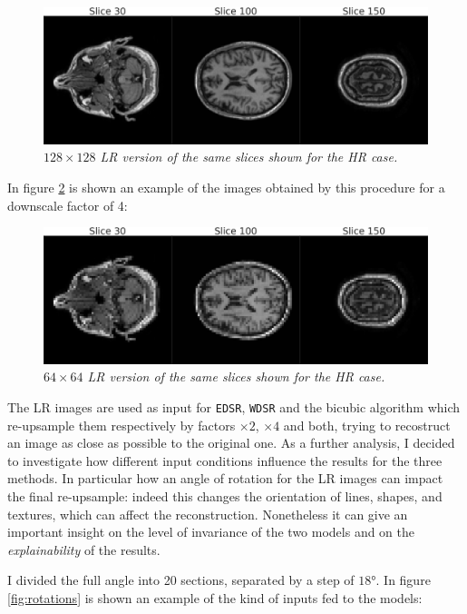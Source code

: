 \documentclass[12pt,a4paper]{report}
\begin{document}
\begin{figure}[H]
 \centering
 \includegraphics[scale=0.3]{images/inp2_slice_comp.png}
 \caption{\it $128 \times 128$ LR version of the same slices shown for the HR case.}
 \label{fig:inp2}
\end{figure}

In figure \ref{fig:inp4} is shown an example of the images obtained by this procedure for a downscale factor of 4:

\begin{figure}[H]
 \centering
 \includegraphics[scale=0.3]{images/inp4_slice_comp.png}
 \caption{\it $64 \times 64$ LR version of the same slices shown for the HR case.}
 \label{fig:inp4}
\end{figure}

The LR images are used as input for {\tt EDSR}, {\tt WDSR} and the bicubic algorithm which re-upsample them respectively by factors $\times 2$, $\times 4$ and both, trying to recostruct an image as close as possible to the original one.
As a further analysis, I decided to investigate how different input conditions influence the results for the three methods. 
In particular how an angle of rotation for the LR images can impact the final re-upsample: indeed this changes the orientation of lines, shapes, and textures, which can affect the reconstruction.
Nonetheless it can give an important insight on the level of invariance of the two models and on the {\it explainability} of the results. 

I divided the full angle into 20 sections, separated by a step of $18$°. In figure \ref{fig:rotations} is shown an example of the kind of inputs fed to the models:
\end{document}
